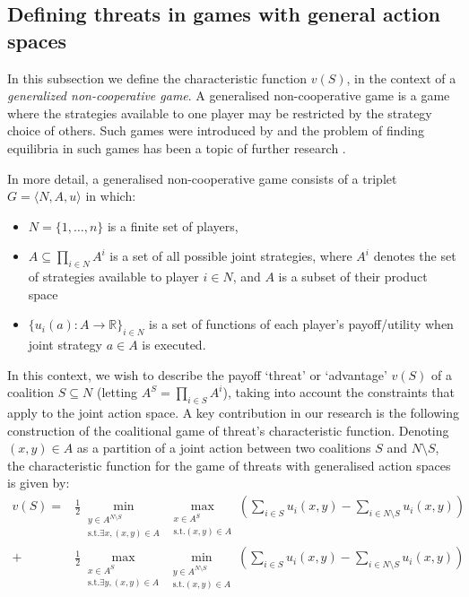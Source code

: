 \subsection{Defining threats in games with general action spaces}\label{the_value_def3}

In this subsection we define the characteristic function $v(S)$, in the context of a \textit{generalized non-cooperative game}.
A generalised non-cooperative game is a game where the strategies available to one player may be restricted by the strategy choice of others.
Such games were introduced by \cite{Debreu01101952} and the problem of finding equilibria in such games has been a topic of further research \citep{Facchinei2007,fischer2014}.

In more detail, a generalised non-cooperative game consists of a triplet $G = \langle N,A,u \rangle$ in which:
\begin{itemize}
\item	$N=\{1,\dots,n\}$ is a finite set of players,
\item	$A\subseteq \prod_{i\in N}A^i$ is a set of all possible joint strategies, where $A^i$ denotes the set of strategies available to player $i\in N$, and $A$ is a subset of their product space
\item	$\{u_i(a) : A\rightarrow \mathbb{R}\}_{i\in N}$ is a set of functions of each player's payoff/utility when joint strategy $a\in A$ is executed.
\end{itemize}

In this context, we wish to describe the payoff `threat' or `advantage' $v(S)$ of a coalition $S\subseteq N$ (letting $A^S=\prod_{i\in S}A^i$), taking into account the constraints that apply to the joint action space.  
A key contribution in our research is the following construction of the coalitional game of threat's characteristic function. 
Denoting $(x,y)\in A$ as a partition of a joint action between two coalitions $S$ and $N\setminus S$, 
the characteristic function for the game of threats with generalised action spaces is given by:
\begin{align}
\label{knvalue1}
v(S) = &
\frac{1}{2}\min_{\substack{y\in A^{N\setminus S} \\ \text{s.t.}\exists x,(x,y)\in A}} 
\max_{\substack{x\in A^S \\ \text{s.t.}(x,y)\in A}}
	\left(\sum_{i\in S} u_i(x,y) - \sum_{i\in N\setminus S}u_i(x,y)\right)\nonumber\\
+&
\frac{1}{2}\max_{\substack{x\in A^S \\ \text{s.t.}\exists y,(x,y)\in A}}
\min_{\substack{y\in A^{N\setminus S} \\ \text{s.t.}(x,y)\in A}}
	\left(\sum_{i\in S} u_i(x,y) - \sum_{i\in N\setminus S} u_i(x,y) \right)
\end{align}

